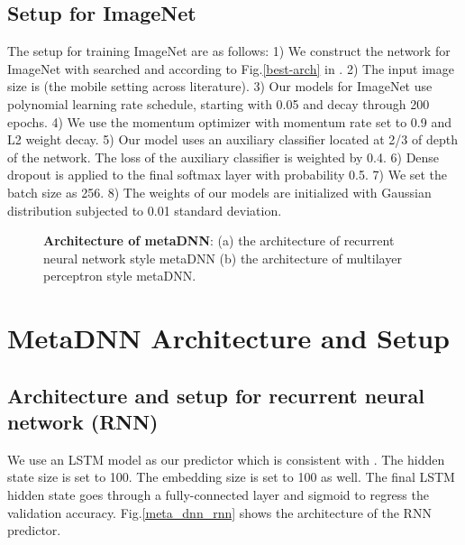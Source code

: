\documentclass[10pt,twocolumn,letterpaper]{article}
\begin{document}
\subsection{Setup for ImageNet}
\label{ap:setup_img}
The setup for training ImageNet are as follows: 1) We construct the network for ImageNet with searched  and  according to Fig.\ref{best-arch} in \cite{zoph2017learning}. 2) The input image size is  (the mobile setting across literature). 3) Our models for ImageNet use polynomial learning rate schedule, starting with 0.05 and decay through 200 epochs. 4) We use the momentum optimizer with momentum rate set to 0.9 and L2 weight decay. 5) Our model uses an auxiliary classifier located at 2/3 of depth of the network. The loss of the auxiliary classifier is weighted by 0.4\cite{SzegedyVISW15}. 6) Dense dropout is applied to the final softmax layer with probability 0.5. 7) We set the batch size as 256. 8) The weights of our models are initialized with Gaussian distribution subjected to 0.01 standard deviation. 


\begin{figure}[t]
  \begin{center}
     \quad
  \end{center}
\caption{ \textbf{Architecture of metaDNN}: (a) the architecture of recurrent neural network style metaDNN (b) the architecture of multilayer perceptron style metaDNN. }
\label{meda_dnn}
\end{figure}


\section{MetaDNN Architecture and Setup}

\label{ap:metadnn-architecture}

\subsection{Architecture and setup for recurrent neural network (RNN)}
We use an LSTM model as our predictor which is consistent with \cite{liu2017progressive}. The hidden state size is set to 100. The embedding size is set to 100 as well. The final LSTM hidden state goes through a fully-connected layer and sigmoid to regress the validation accuracy. Fig.\ref{meta_dnn_rnn} shows the architecture of the RNN predictor. 
\end{document}
